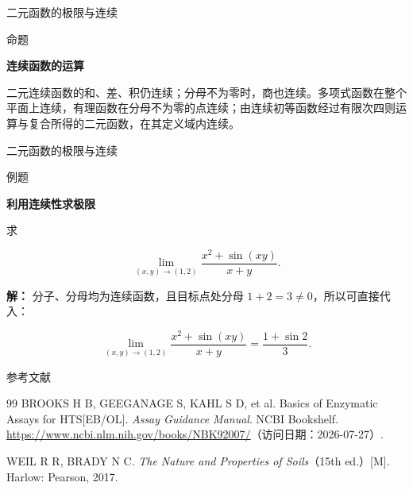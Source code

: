 \documentclass[aspectratio=169,10pt,fontset=fandol]{ctexbeamer}
\begin{document}
\begin{frame}[t,fragile]{二元函数的极限与连续}
\normalsize
\begin{block}{命题}
{\normalsize
\textbf{连续函数的运算}\par


	二元连续函数的和、差、积仍连续；分母不为零时，商也连续。多项式函数在整个平面上连续，有理函数在分母不为零的点连续；由连续初等函数经过有限次四则运算与复合所得的二元函数，在其定义域内连续。


}
\end{block}
\end{frame}
\begin{frame}[t,fragile]{二元函数的极限与连续}
\normalsize
\begin{block}{例题}
{\normalsize
\textbf{利用连续性求极限}\par


	求

	\[

	\lim_{(x,y)\to(1,2)}

	\frac{x^2+\sin(xy)}{x+y}.

	\]


}
\end{block}
\pause
{\normalsize
\textbf{解：}
分子、分母均为连续函数，且目标点处分母 \(1+2=3\neq0\)，所以可直接代入：

	\[

	\lim_{(x,y)\to(1,2)}

	\frac{x^2+\sin(xy)}{x+y}

	=\frac{1+\sin2}{3}.

	\]


}
\end{frame}
\begin{frame}[t,fragile]{参考文献}
\normalsize
{\normalsize
\begin{thebibliography}{99}
 BROOKS H B, GEEGANAGE S, KAHL S D, et al. Basics of Enzymatic Assays for HTS[EB/OL]. \emph{Assay Guidance Manual}. NCBI Bookshelf. \url{https://www.ncbi.nlm.nih.gov/books/NBK92007/}（访问日期：2026-07-27）.

 WEIL R R, BRADY N C. \emph{The Nature and Properties of Soils}（15th ed.）[M]. Harlow: Pearson, 2017.

\end{thebibliography}
}
\end{frame}
\end{document}

